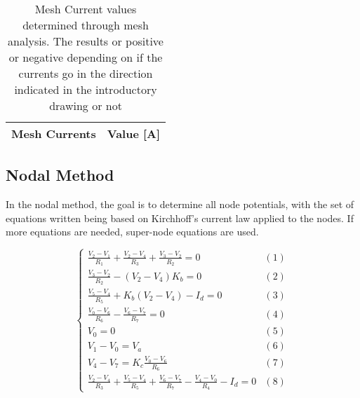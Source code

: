 \begin{table}[hbt!]
  \centering
  \begin{tabular}{|c|c|}
    \hline    
    {\bf Mesh Currents} & {\bf Value [A]} \\ \hline
    
  \end{tabular}
  \caption{Mesh Current values determined through mesh analysis. The results or positive or negative depending on if the currents go in the direction indicated in the introductory drawing or not}
  \label{tab:mesh}
\end{table}




\subsection{Nodal Method}
\par

In the nodal method, the goal is to determine all node potentials, with the set of equations written being based on Kirchhoff's current law applied to the nodes. If more equations are needed, super-node equations are used.

\begin{equation}
  \begin{cases}
    \frac{V_2-V_1}{R_1} + \frac{V_2-V_4}{R_3} + \frac{V_3-V_2}{R_2} = 0 & \mbox{$(1)$} \\
    \frac{V_3-V_2}{R_2} - (V_2-V_4) K_b = 0 & \mbox{$(2)$} \\
    \frac{V_5-V_4}{R_5} + K_b (V_2 - V_4) - I_d = 0 & \mbox{$(3)$}\\
    \frac{V_0-V_6}{R_6} - \frac{V_6-V_7}{R_7} = 0 & \mbox{$(4)$}\\
    V_0 = 0 & \mbox{$(5)$} \\
    V_1-V_0 = V_a & \mbox{$(6)$}  \\
    V_4-V_7 = K_c \frac{V_0-V_6}{R_6} & \mbox{$(7)$} \\
    \frac{V_2-V_4}{R_3} + \frac{V_5-V_4}{R_5} +  \frac{V_6-V_7}{R_7} - \frac{V_4-V_0}{R_4} - I_d = 0 & \mbox{$(8)$}
  \end{cases}
\end{equation}

